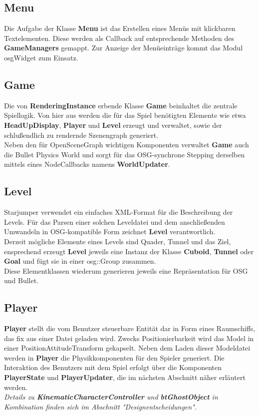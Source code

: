 \documentclass{llncs}
\begin{document}
\subsection{Menu}
Die Aufgabe der Klasse \textbf{Menu} ist das Erstellen eines Men\"us mit klickbaren Textelementen. Diese
werden als Callback auf entsprechende Methoden des \textbf{GameManagers} gemappt. Zur Anzeige der Men\"ueintr\"age
kommt das Modul osgWidget zum Einsatz.

\subsection{Game}
Die von \textbf{RenderingInstance} erbende Klasse \textbf{Game} beinhaltet die zentrale Spiellogik. Von hier aus werden die
f\"ur das Spiel ben\"otigten Elemente wie etwa \textbf{HeadUpDisplay}, \textbf{Player} und \textbf{Level} erzeugt und verwaltet,
sowie der schlu\ss endlich zu rendernde Szenengraph generiert.\\
Neben den f\"ur OpenSceneGraph wichtigen Komponenten verwaltet \textbf{Game} auch die Bullet Physics World und sorgt
f\"ur das OSG-synchrone Stepping derselben mittels eines NodeCallbacks namens \textbf{WorldUpdater}.

\subsection{Level}
Starjumper verwendet ein einfaches XML-Format f\"ur die Beschreibung der Levels. F\"ur das Parsen einer
solchen Leveldatei und dem anschlie\ss enden Umwandeln in OSG-kompatible Form zeichnet \textbf{Level} verantwortlich.\\
Derzeit m\"ogliche Elemente eines Levels sind Quader, Tunnel und das Ziel, ensprechend erzeugt \textbf{Level}
jeweils eine Instanz der Klasse \textbf{Cuboid}, \textbf{Tunnel} oder \textbf{Goal} und f\"ugt sie in einer osg::Group zusammen.\\
Diese Elementklassen wiederum generieren jeweils eine Repr\"asentation f\"ur OSG und Bullet.

\subsection{Player}
\textbf{Player} stellt die vom Benutzer steuerbare Entit\"at dar in Form eines Raumschiffs, das fix aus einer Datei
geladen wird. Zwecks Positionierbarkeit wird das Model in einer PositionAttitudeTransform gekapselt.
Neben dem Laden dieser Modeldatei werden in \textbf{Player} die Physikkomponenten f\"ur den Spieler generiert.
Die Interaktion des Benutzers mit dem Spiel erfolgt \"uber die Komponenten \textbf{PlayerState} und \textbf{PlayerUpdater},
die im n\"achsten Abschnitt n\"aher erl\"autert werden.\\
\textit{Details zu \textbf{KinematicCharacterController} und \textbf{btGhostObject} in Kombination finden sich im Abschnitt "Designentscheidungen".}
\end{document}
